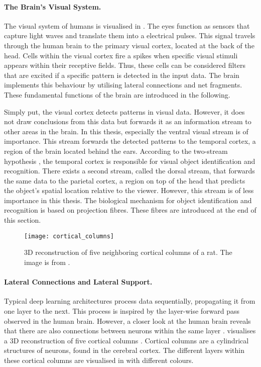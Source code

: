 \paragraph{The Brain's Visual System.} The visual system of humans is visualised in . The eyes function as sensors that capture light waves and translate them into a electrical pulses. This signal travels through the human brain to the primary visual cortex, located at the back of the head.
Cells within the visual cortex fire a spikes when specific visual stimuli appears within their receptive fields. Thus, these cells can be considered filters that are excited if a specific pattern is detected in the input data. The brain implements this behaviour by utilising lateral connections and net fragments. These fundamental functions of the brain are introduced in the following.

Simply put, the visual cortex detects patterns in visual data. However, it does not draw conclusions from this data but forwards it as an information stream to other areas in the brain. In this thesis, especially the ventral visual stream is of importance. This stream forwards the detected patterns to the temporal cortex, a region of the brain located behind the ears.
According to the two-stream hypothesis , the temporal cortex is responsible for visual object identification and recognition. There exists a second stream, called the dorsal stream, that forwards the same data to the parietal cortex, a region on top of the head that predicts the object's spatial location relative to the viewer. However, this stream is of less importance in this thesis. The biological mechanism for object identification and recognition is based on projection fibres. These fibres are introduced at the end of this section.


\begin{figure}[h]
    \centering
    \texttt{[image: cortical\_columns]}
    \caption[3D reconstruction of five neighbouring cortical columns]{3D reconstruction of five neighboring cortical columns of a rat. The image is from .}
\end{figure}

\paragraph{Lateral Connections and Lateral Support.} Typical deep learning architectures process data sequentially, propagating it from one layer to the next. 
This process is inspired  by the layer-wise forward pass observed in the human brain.
However, a closer look at the human brain reveals that there are also connections between neurons within the same layer .
 visualises a 3D reconstruction of five cortical columns . Cortical columns are a cylindrical structures of neurons, found in the cerebral cortex. 
The different layers within these cortical columns are visualised in  with different colours.

